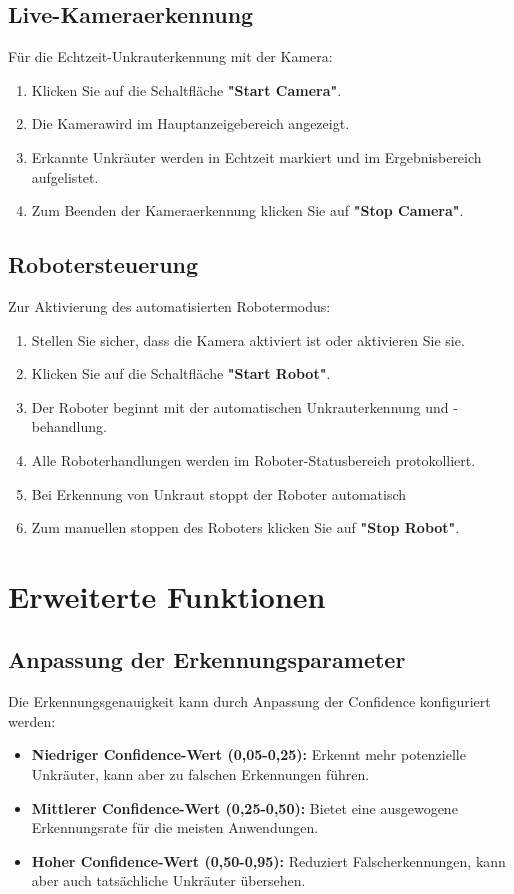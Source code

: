 \documentclass[12pt, a4paper]{scrreprt}
\begin{document}
\subsection{Live-Kameraerkennung}
Für die Echtzeit-Unkrauterkennung mit der Kamera:
\begin{enumerate}
    \item Klicken Sie auf die Schaltfläche \textbf{"Start Camera"}.
    \item Die Kamerawird im Hauptanzeigebereich angezeigt.
    \item Erkannte Unkräuter werden in Echtzeit markiert und im Ergebnisbereich aufgelistet.
    \item Zum Beenden der Kameraerkennung klicken Sie auf \textbf{"Stop Camera"}.
\end{enumerate}

\subsection{Robotersteuerung}
Zur Aktivierung des automatisierten Robotermodus:
\begin{enumerate}
    \item Stellen Sie sicher, dass die Kamera aktiviert ist oder aktivieren Sie sie.
    \item Klicken Sie auf die Schaltfläche \textbf{"Start Robot"}.
    \item Der Roboter beginnt mit der automatischen Unkrauterkennung und -behandlung.
    \item Alle Roboterhandlungen werden im Roboter-Statusbereich protokolliert.
    \item Bei Erkennung von Unkraut stoppt der Roboter automatisch
    \item Zum manuellen stoppen des Roboters klicken Sie auf \textbf{"Stop Robot"}.
\end{enumerate}

\section{Erweiterte Funktionen}

\subsection{Anpassung der Erkennungsparameter}
Die Erkennungsgenauigkeit kann durch Anpassung der Confidence konfiguriert werden:
\begin{itemize}
    \item \textbf{Niedriger Confidence-Wert (0,05-0,25):} Erkennt mehr potenzielle Unkräuter, kann aber zu falschen Erkennungen führen.
    \item \textbf{Mittlerer Confidence-Wert (0,25-0,50):} Bietet eine ausgewogene Erkennungsrate für die meisten Anwendungen.
    \item \textbf{Hoher Confidence-Wert (0,50-0,95):} Reduziert Falscherkennungen, kann aber auch tatsächliche Unkräuter übersehen.
\end{itemize}
\end{document}
